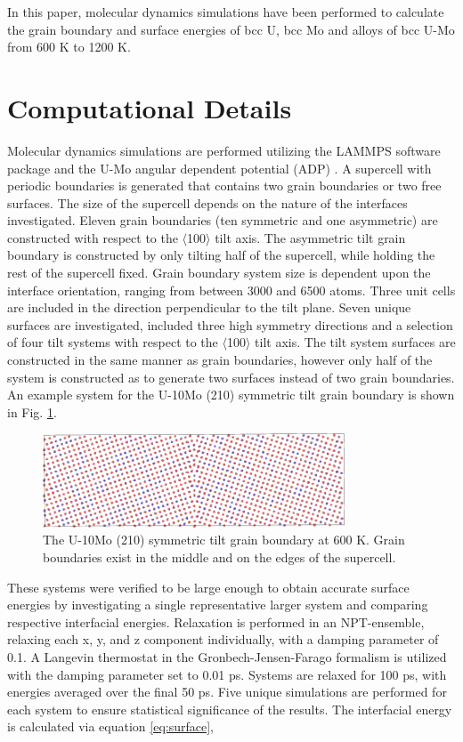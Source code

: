 \documentclass[review]{elsarticle}
\begin{document}
In this paper, molecular dynamics simulations have been performed to calculate the grain boundary and surface energies of bcc U, bcc Mo and alloys of bcc U-Mo from 600 K to 1200 K. 

\section{Computational Details}
Molecular dynamics simulations are performed utilizing the LAMMPS \cite{plimpton1995} software package and the U-Mo angular dependent potential (ADP) \cite{smirnovaADP}. A supercell with periodic boundaries is generated that contains two grain boundaries or two free surfaces. The size of the supercell depends on the nature of the interfaces investigated. Eleven grain boundaries (ten symmetric and one asymmetric) are constructed with respect to the $\langle$100$\rangle$ tilt axis. The asymmetric tilt grain boundary is constructed by only tilting half of the supercell, while holding the rest of the supercell fixed. Grain boundary system size is dependent upon the interface orientation, ranging from between 3000 and 6500 atoms. Three unit cells are included in the direction perpendicular to the tilt plane. Seven unique surfaces are investigated, included three high symmetry directions and a selection of four tilt systems with respect to the $\langle$100$\rangle$ tilt axis. The tilt system surfaces are constructed in the same manner as grain boundaries, however only half of the system is constructed as to generate two surfaces instead of two grain boundaries.  An example system for the U-10Mo (210) symmetric tilt grain boundary is shown in Fig. \ref{fig:gbex}.

\begin{figure}[h]
 \centering
 \includegraphics[width=0.8\textwidth]{gbex.png} 
 \caption{The U-10Mo (210) symmetric tilt grain boundary at 600 K. Grain boundaries exist in the middle and on the edges of the supercell. }
 \label{fig:gbex}
\end{figure}

These systems were verified to be large enough to obtain accurate surface energies by investigating a single representative larger system and comparing respective interfacial energies. Relaxation is performed in an NPT-ensemble, relaxing each x, y, and z component individually, with a damping parameter of 0.1. A Langevin thermostat in the Gronbech-Jensen-Farago \cite{gjf2014} formalism is utilized with the damping parameter set to 0.01 ps. Systems are relaxed for 100 ps, with energies averaged over the final 50 ps. Five unique simulations are performed for each system to ensure statistical significance of the results. The interfacial energy is calculated via equation \ref{eq:surface},
\end{document}
